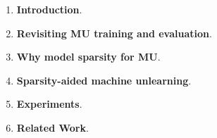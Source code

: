 \begin{enumerate}
    \item \textbf{Introduction}.
    \item \textbf{Revisiting MU training and evaluation}.
    \item \textbf{Why model sparsity for MU}.
    \item \textbf{Sparsity-aided machine unlearning}.
    \item \textbf{Experiments}.
    \item \textbf{Related Work}. 
\end{enumerate}